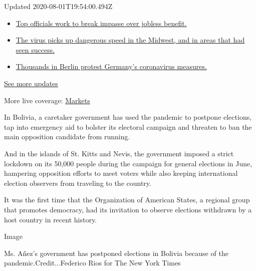 Updated 2020-08-01T19:54:00.494Z

\begin{itemize}
\tightlist
\item
  \href{https://www.nytimes3xbfgragh.onion/2020/08/01/world/coronavirus-covid-19.html?action=click\&pgtype=Article\&state=default\&region=MAIN_CONTENT_1\&context=storylines_live_updates\#link-3ac56579}{Top
  officials work to break impasse over jobless benefit.}
\item
  \href{https://www.nytimes3xbfgragh.onion/2020/08/01/world/coronavirus-covid-19.html?action=click\&pgtype=Article\&state=default\&region=MAIN_CONTENT_1\&context=storylines_live_updates\#link-8796723}{The
  virus picks up dangerous speed in the Midwest, and in areas that had
  seen success.}
\item
  \href{https://www.nytimes3xbfgragh.onion/2020/08/01/world/coronavirus-covid-19.html?action=click\&pgtype=Article\&state=default\&region=MAIN_CONTENT_1\&context=storylines_live_updates\#link-25930521}{Thousands
  in Berlin protest Germany's coronavirus measures.}
\end{itemize}

\href{https://www.nytimes3xbfgragh.onion/2020/08/01/world/coronavirus-covid-19.html?action=click\&pgtype=Article\&state=default\&region=MAIN_CONTENT_1\&context=storylines_live_updates}{See
more updates}

More live coverage:
\href{https://www.nytimes3xbfgragh.onion/live/2020/07/31/business/stock-market-today-coronavirus?action=click\&pgtype=Article\&state=default\&region=MAIN_CONTENT_1\&context=storylines_live_updates}{Markets}

In Bolivia, a caretaker government has used the pandemic to postpone
elections, tap into emergency aid to bolster its electoral campaign and
threaten to ban the main opposition candidate from running.

And in the islands of St. Kitts and Nevis, the government imposed a
strict lockdown on its 50,000 people during the campaign for general
elections in June, hampering opposition efforts to meet voters while
also keeping international election observers from traveling to the
country.

It was the first time that the Organization of American States, a
regional group that promotes democracy, had its invitation to observe
elections withdrawn by a host country in recent history.

Image

Ms. Añez's government has postponed elections in Bolivia because of the
pandemic.Credit...Federico Rios for The New York Times

